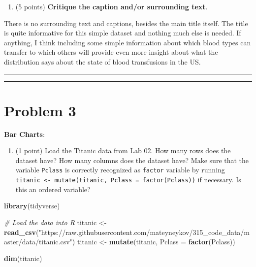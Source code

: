 \documentclass[]{article}
\newenvironment{Shaded}{\begin{snugshade}}{\end{snugshade}}
\newcommand{\CommentTok}[1]{\textcolor[rgb]{0.56,0.35,0.01}{\textit{#1}}}
\newcommand{\DataTypeTok}[1]{\textcolor[rgb]{0.13,0.29,0.53}{#1}}
\newcommand{\KeywordTok}[1]{\textcolor[rgb]{0.13,0.29,0.53}{\textbf{#1}}}
\newcommand{\NormalTok}[1]{#1}
\newcommand{\StringTok}[1]{\textcolor[rgb]{0.31,0.60,0.02}{#1}}
\providecommand{\tightlist}{%
  \setlength{\itemsep}{0pt}\setlength{\parskip}{0pt}}
\begin{document}
\begin{enumerate}
\def\labelenumi{\alph{enumi}.}
\setcounter{enumi}{3}
\tightlist
\item
  (5 points) \textbf{Critique the caption and/or surrounding text}.
\end{enumerate}

There is no surrounding text and captions, besides the main title
itself. The title is quite informative for this simple dataset and
nothing much else is needed. If anything, I think including some simple
information about which blood types can transfer to which others will
provide even more insight about what the distribution says about the
state of blood transfusions in the US.

\begin{center}\rule{0.5\linewidth}{\linethickness}\end{center}

\begin{center}\rule{0.5\linewidth}{\linethickness}\end{center}

\hypertarget{problem-3}{%
\section{Problem 3}\label{problem-3}}

\textbf{Bar Charts}:

\begin{enumerate}
\def\labelenumi{\alph{enumi}.}
\tightlist
\item
  (1 point) Load the Titanic data from Lab 02. How many rows does the
  dataset have? How many columns does the dataset have? Make sure that
  the variable \texttt{Pclass} is correctly recognized as
  \texttt{factor} variable by running
  \texttt{titanic\ \textless{}-\ mutate(titanic,\ Pclass\ =\ factor(Pclass))}
  if necessary. Is this an ordered variable?
\end{enumerate}

\begin{Shaded}
\begin{Highlighting}[]
\KeywordTok{library}\NormalTok{(tidyverse)}

\CommentTok{#  Load the data into R}
\NormalTok{titanic <-}\StringTok{ }\KeywordTok{read_csv}\NormalTok{(}\StringTok{"https://raw.githubusercontent.com/mateyneykov/315_code_data/master/data/titanic.csv"}\NormalTok{)}
\NormalTok{titanic <-}\StringTok{ }\KeywordTok{mutate}\NormalTok{(titanic, }\DataTypeTok{Pclass =} \KeywordTok{factor}\NormalTok{(Pclass))}

\KeywordTok{dim}\NormalTok{(titanic)}
\end{Highlighting}
\end{Shaded}
\end{document}
